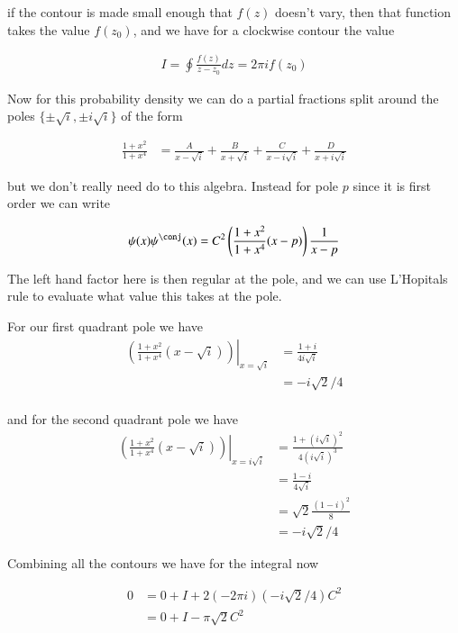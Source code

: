 \documentclass{article}
\begin{document}
if the contour is made small enough that $f(z)$ doesn't vary, then that function takes the value $f(z_0)$, and we have for a clockwise contour the value

\begin{align*}
I = \oint \frac{f(z)}{z -z_0} dz = 2 \pi i f(z_0)
\end{align*}

Now for this probability density we can do a 
partial fractions split around the poles $\{\pm\sqrt{i}, \pm i \sqrt{i}\}$ of the form

\begin{align*}
\frac{1 + x^2}{1 + x^4} &=
\frac{A}{x -\sqrt{i}}
+\frac{B}{x +\sqrt{i}}
+\frac{C}{x -i\sqrt{i}}
+\frac{D}{x +i\sqrt{i}}
\end{align*}

but we don't really need do to this algebra.  Instead for pole $p$ since it is first order we can write

\begin{align*}
\psi(x)\psi^\conj(x) = C^2 \left(\frac{1 + x^2}{1 + x^4} (x - p)\right) \inv{x - p}
\end{align*}

The left hand factor here is then regular at the pole, and we can use L'Hopitals rule to evaluate what value this takes at the pole.

For our first quadrant pole we have
\begin{align*}
{\left. \left(\frac{1 + x^2}{1 + x^4} (x - \sqrt{i})\right) \right\vert}_{x=\sqrt{i}}
&= \frac{ 1 + i }{4 i\sqrt{i}} \\
&= -i\sqrt{2}/4 \\
\end{align*}

and for the second quadrant pole we have
\begin{align*}
{\left. \left(\frac{1 + x^2}{1 + x^4} (x - \sqrt{i})\right) \right\vert}_{x=i\sqrt{i}}
&= \frac{ 1 + (i\sqrt{i})^2 }{4 (i\sqrt{i})^3} \\
&= \frac{ 1 - i }{4 \sqrt{i}} \\
&= \sqrt{2}\frac{ (1 - i)^2 }{8} \\
&= -i\sqrt{2}/4
\end{align*}

Combining all the contours we have for the integral now

\begin{align*}
0 
&= 0 + I + 2(-2\pi i)(-i\sqrt{2}/4) C^2 \\
&= 0 + I - \pi \sqrt{2} C^2 \\
\end{align*}
\end{document}
